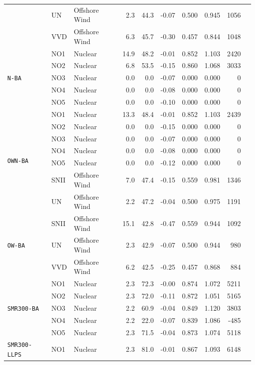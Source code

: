 \begin{table}[htbp]
\begin{tabular}{lllrrrrrrr}
 & UN & Offshore Wind & 2.3 & 44.3 & -0.07 & 0.500 & 0.945 & 1056 \\
 & VVD & Offshore Wind & 6.3 & 45.7 & -0.30 & 0.457 & 0.844 & 1048 \\
\midrule
\multirow{5}{*}{\texttt{N-BA}} & NO1 & Nuclear & 14.9 & 48.2 & -0.01 & 0.852 & 1.103 & 2420 \\
 & NO2 & Nuclear & 6.8 & 53.5 & -0.15 & 0.860 & 1.068 & 3033 \\
 & NO3 & Nuclear & 0.0 & 0.0 & -0.07 & 0.000 & 0.000 & 0 \\
 & NO4 & Nuclear & 0.0 & 0.0 & -0.08 & 0.000 & 0.000 & 0 \\
 & NO5 & Nuclear & 0.0 & 0.0 & -0.10 & 0.000 & 0.000 & 0 \\
\midrule
\multirow{7}{*}{\texttt{OWN-BA}} & NO1 & Nuclear & 13.3 & 48.4 & -0.01 & 0.852 & 1.103 & 2439 \\
 & NO2 & Nuclear & 0.0 & 0.0 & -0.15 & 0.000 & 0.000 & 0 \\
 & NO3 & Nuclear & 0.0 & 0.0 & -0.07 & 0.000 & 0.000 & 0 \\
 & NO4 & Nuclear & 0.0 & 0.0 & -0.08 & 0.000 & 0.000 & 0 \\
 & NO5 & Nuclear & 0.0 & 0.0 & -0.12 & 0.000 & 0.000 & 0 \\
 & SNII & Offshore Wind & 7.0 & 47.4 & -0.15 & 0.559 & 0.981 & 1346 \\
 & UN & Offshore Wind & 2.2 & 47.2 & -0.04 & 0.500 & 0.975 & 1191 \\
\midrule
\multirow{3}{*}{\texttt{OW-BA}} & SNII & Offshore Wind & 15.1 & 42.8 & -0.47 & 0.559 & 0.944 & 1092 \\
 & UN & Offshore Wind & 2.3 & 42.9 & -0.07 & 0.500 & 0.944 & 980 \\
 & VVD & Offshore Wind & 6.2 & 42.5 & -0.25 & 0.457 & 0.868 & 884 \\
\midrule
\multirow{5}{*}{\texttt{SMR300-BA}} & NO1 & Nuclear & 2.3 & 72.3 & -0.00 & 0.874 & 1.072 & 5211 \\
 & NO2 & Nuclear & 2.3 & 72.0 & -0.11 & 0.872 & 1.051 & 5165 \\
 & NO3 & Nuclear & 2.2 & 60.9 & -0.04 & 0.849 & 1.120 & 3803 \\
 & NO4 & Nuclear & 2.2 & 22.0 & -0.07 & 0.839 & 1.086 & -485 \\
 & NO5 & Nuclear & 2.3 & 71.5 & -0.04 & 0.873 & 1.074 & 5118 \\
\midrule
\multirow{5}{*}{\texttt{SMR300-LLPS}} & NO1 & Nuclear & 2.3 & 81.0 & -0.01 & 0.867 & 1.093 & 6148 \\

\end{tabular}
\end{table}
